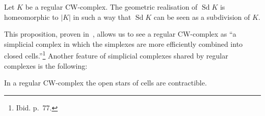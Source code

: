 \documentclass[AHL,Unicode,longabstracts,published]{cedram}
\DeclareMathOperator{\Sd}{Sd}
\begin{document}
\begin{prop}\label{prop:bar_sub_cw}
Let $K$ be a regular CW-complex. The geometric realisation of $\Sd K$ is homeomorphic to $|K|$ in such a way that $\Sd K$ can be seen as a subdivision of $K$.
\end{prop}

This proposition, proven in~\cite[Theorem~1.7, pp.~80-81.]{Lun-Wei_top_cw},
allows us to see a regular CW-complex as ``a simplicial complex in which the simplexes are more efficiently combined into closed cells.''\footnote{Ibid. p.~77.} Another feature of simplicial complexes shared by regular complexes is the following:

\begin{prop}
In a regular CW-complex the open stars of cells are contractible.
\end{prop}
\end{document}
